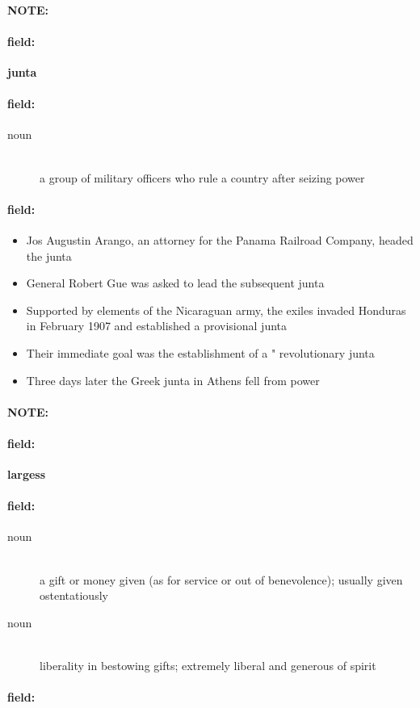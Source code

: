 \documentclass[12pt]{article}
\newenvironment{note}{\paragraph{NOTE:}}{}
\newenvironment{field}{\paragraph{field:}}{}
\begin{document}
\begin{note}
\begin{field}
\textbf{\large junta}
\end{field}


\begin{field}
\begin{description}
\item[noun] \hfill \\ 
a group of military officers who rule a country after seizing power

\end{description}
\end{field}

\begin{field}
\begin{itemize}
\item Jos Augustin Arango, an attorney for the Panama Railroad Company, headed the junta
\item General Robert Gue was asked to lead the subsequent junta
\item Supported by elements of the Nicaraguan army, the exiles invaded Honduras in February 1907 and established a provisional junta
\item Their immediate goal was the establishment of a " revolutionary junta
\item Three days later the Greek junta in Athens fell from power
\end{itemize}
\end{field}
\end{note}
\begin{note}
\begin{field}
\textbf{\large largess}
\end{field}


\begin{field}
\begin{description}
\item[noun] \hfill \\ 
a gift or money given (as for service or out of benevolence); usually given ostentatiously

\item[noun] \hfill \\ 
liberality in bestowing gifts; extremely liberal and generous of spirit

\end{description}
\end{field}

\begin{field}
\end{field}
\end{note}
\end{document}

